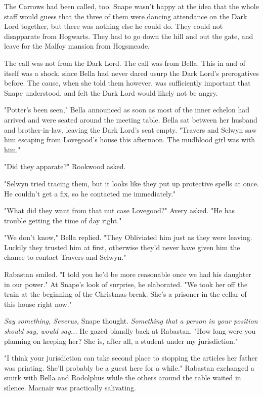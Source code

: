 The Carrows had been called, too. Snape wasn't happy at the idea that the whole staff would guess that the three of them were dancing attendance on the Dark Lord together, but there was nothing else he could do. They could not disapparate from Hogwarts. They had to go down the hill and out the gate, and leave for the Malfoy mansion from Hogsmeade.

The call was not from the Dark Lord. The call was from Bella. This in and of itself was a shock, since Bella had never dared usurp the Dark Lord's prerogatives before. The cause, when she told them however, was sufficiently important that Snape understood, and felt the Dark Lord would likely not be angry.

"Potter's been seen," Bella announced as soon as most of the inner echelon had arrived and were seated around the meeting table. Bella sat between her husband and brother-in-law, leaving the Dark Lord's seat empty. "Travers and Selwyn saw him escaping from Lovegood's house this afternoon. The mudblood girl was with him."

"Did they apparate?" Rookwood asked.

"Selwyn tried tracing them, but it looks like they put up protective spells at once. He couldn't get a fix, so he contacted me immediately."

"What did they want from that nut case Lovegood?" Avery asked. "He has trouble getting the time of day right."

"We don't know," Bella replied. "They Obliviated him just as they were leaving. Luckily they trusted him at first, otherwise they'd never have given him the chance to contact Travers and Selwyn."

Rabastan smiled. "I told you he'd be more reasonable once we had his daughter in our power." At Snape's look of surprise, he elaborated. "We took her off the train at the beginning of the Christmas break. She's a prisoner in the cellar of this house right now."

\emph{Say something, Severus,} Snape thought. \emph{Something that a person in your position should say, would say...} He gazed blandly back at Rabastan. "How long were you planning on keeping her? She is, after all, a student under my jurisdiction."

"I think your jurisdiction can take second place to stopping the articles her father was printing. She'll probably be a guest here for a while." Rabastan exchanged a smirk with Bella and Rodolphus while the others around the table waited in silence. Macnair was practically salivating.

